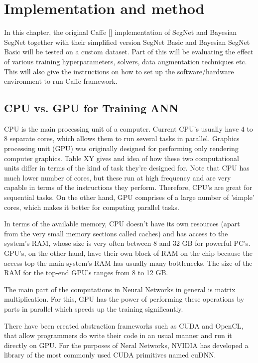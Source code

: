 \chapter{Implementation and method}

In this chapter, the original Caffe [] implementation of SegNet and Bayesian SegNet together with their simplified version SegNet Basic and Bayesian SegNet Basic will be tested on a custom dataset. Part of this will be evaluating the effect of various training hyperparameters, solvers, data augmentation techniques etc. This will also give the instructions on how to set up the software/hardware environment to run Caffe framework.

\section{CPU vs. GPU for Training ANN}

CPU is the main processing unit of a computer. Current CPU's usually have 4 to 8 separate cores, which allows them to run several tasks in parallel. Graphics processing unit (GPU) was originally designed for performing only rendering computer graphics. Table XY gives and idea of how these two computational units differ in terms of the kind of task they're designed for. Note that CPU has much lower number of cores, but these run at high frequency and are very capable in terms of the instructions they perform. Therefore, CPU's are great for sequential tasks. On the other hand, GPU comprises of a large number of 'simple' cores, which makes it better for computing parallel tasks. 

In terms of the available memory, CPU doesn't have its own resources (apart from the very small memory sections called caches) and has access to the system's RAM, whose size is very often between 8 and 32 GB for powerful PC's. GPU's, on the other hand, have their own block of RAM on the chip because the access top the main system's RAM has usually many bottlenecks. The size of the RAM for the top-end GPU's ranges from 8 to 12 GB.

The main part of the computations in Neural Networks in general is matrix multiplication. For this, GPU has the power of performing these operations by parts in parallel which speeds up the training significantly. 

There have been created abstraction frameworks such as CUDA and OpenCL, that allow programmers do write their code in an usual manner and run it directly on GPU. For the purposes of Neral Networks, NVIDIA has developed a library of the most commonly used CUDA primitives named cuDNN. 

